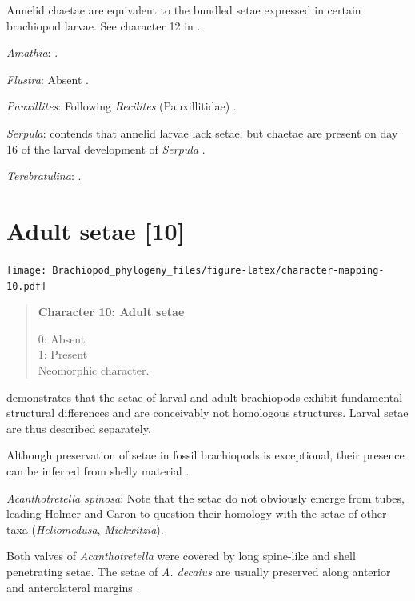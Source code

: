 \documentclass[openany]{book}
\begin{document}
Annelid chaetae are equivalent to the bundled setae expressed in certain
brachiopod larvae. See character 12 in \citet{Vinther2008}.

\hypertarget{Amathia-coding-9}{}
\emph{Amathia}: \citep{Reed1982}.

\hypertarget{Flustra-coding-9}{}
\emph{Flustra}: Absent \citep{Zimmer2013}.

\hypertarget{Pauxillites-coding-9}{}
\emph{Pauxillites}: Following \emph{Recilites} (Pauxillitidae)
\citep{Dzik1978}.

\hypertarget{Serpula-coding-9}{}
\emph{Serpula}: \citet{Luter2000} contends that annelid larvae lack
setae, but chaetae are present on day 16 of the larval development of
\emph{Serpula} \citep{Keay2007}.

\hypertarget{Terebratulina-coding-9}{}
\emph{Terebratulina}: \citet{Williams1997Introduction}.

\section{Adult setae {[}10{]}}\label{adult-setae-10}

\texttt{[image: Brachiopod\_phylogeny\_files/figure-latex/character-mapping-10.pdf]}

\begin{quote}
\textbf{Character 10: Adult setae}

0: Absent\\
1: Present\\
Neomorphic character.
\end{quote}

\citet{Luter2000} demonstrates that the setae of larval and adult
brachiopods exhibit fundamental structural differences and are
conceivably not homologous structures. Larval setae are thus described
separately.

Although preservation of setae in fossil brachiopods is exceptional,
their presence can be inferred from shelly material
\citep[see][]{Holmer2006Aspinose}.

\hypertarget{Acanthotretella_spinosa-coding-10}{}
\emph{Acanthotretella spinosa}: Note that the setae do not obviously
emerge from tubes, leading Holmer and Caron to question their homology
with the setae of other taxa (\emph{Heliomedusa}, \emph{Mickwitzia}).

Both valves of \emph{Acanthotretella} were covered by long spine-like
and shell penetrating setae. The setae of \emph{A. decaius} are usually
preserved along anterior and anterolateral margins
\citep{Hu2010Softpart}.
\end{document}

